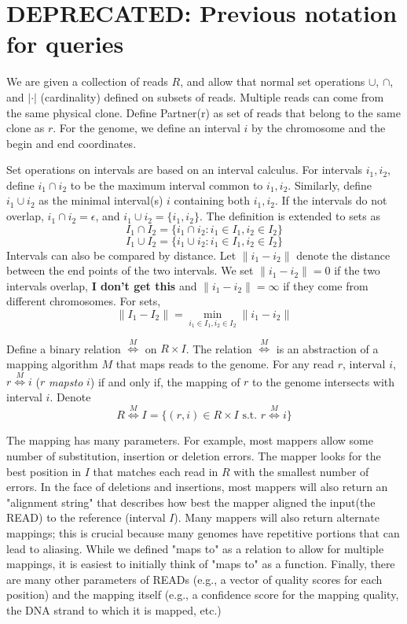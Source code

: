 \documentclass[10pt,fullpage]{article}
\newcommand{\MapRel}{\ensuremath{\stackrel{M}{\Leftrightarrow}}}
\begin{document}
\section{DEPRECATED: Previous notation for queries}
We are given a collection of reads $R$, and allow that normal set
operations $\cup$, $\cap$, and $|\cdot|$ (cardinality) defined on
subsets of reads. Multiple reads can come from the same physical
clone. Define {\sc Partner}(r) as set of reads that belong to the same
clone as $r$.  For the genome, we define an interval $i$ by the
chromosome and the begin and end coordinates. 

Set operations on intervals are based on an interval calculus. For
intervals $i_1,i_2$, define $i_1\cap i_2$ to be the maximum interval
common to $i_1,i_2$. Similarly, define $i_1\cup i_2$ as the minimal
interval(s) $i$ containing both $i_1,i_2$. If the intervals do not
overlap, $i_1\cap i_2=\epsilon$, and $i_1\cup i_2 = \{i_1,i_2\}$. The
definition is extended to sets as
\[I_1\cap I_2 = \{ i_1 \cap i_2: i_1\in I_1, i_2\in I_2 \}
\]
\[I_1\cup I_2 = \{ i_1 \cup i_2: i_1\in I_1, i_2\in I_2 \}
\]
Intervals can also be compared by distance. Let $\parallel
i_1-i_2\parallel$ denote the distance between the end points of the
two intervals. We set $\parallel i_1-i_2\parallel=0$ if the two
intervals overlap, {\bf I don't get this} and $\parallel i_1-i_2\parallel=\infty$ if they
come from different chromosomes. For sets, 
\[
\parallel I_1-I_2 \parallel= \min_{i_1\in I_1, i_2\in I_2} \parallel i_1-i_2 \parallel
\]


Define a binary relation $\MapRel$ on $R\times I$. The relation
$\MapRel$ is an abstraction of a mapping algorithm $M$ that maps reads
to the genome. For any read $r$, interval $i$, $r\MapRel i$ ($r$
\emph{mapsto} $i$) if and only if, the mapping of $r$ to the genome
intersects with interval $i$. Denote
\[ R\MapRel I = \{ (r,i)\in R\times I \mbox{ s.t. } r\MapRel i\}
\]


The mapping has many parameters.  For example, most mappers allow
some number of substitution, insertion or deletion errors.  The
mapper looks for the best position in $I$ that matches each 
read in $R$ with the smallest number of errors.  In the face
of deletions and insertions, most mappers will also return an
"alignment string" that describes how best the mapper aligned
the input(the READ) to the reference (interval $I$).   Many
mappers will also return alternate mappings; this is crucial
because many genomes have repetitive portions that can lead to
aliasing.  While we defined "maps to" as a relation to allow for
multiple mappings, it is easiest to initially think of "maps to" as
a function.    Finally, there are many other parameters of
READs (e.g., a vector of quality scores for each position)
and the mapping itself (e.g., a confidence score for the
mapping quality, the DNA strand to which it is mapped, etc.)
\end{document}

